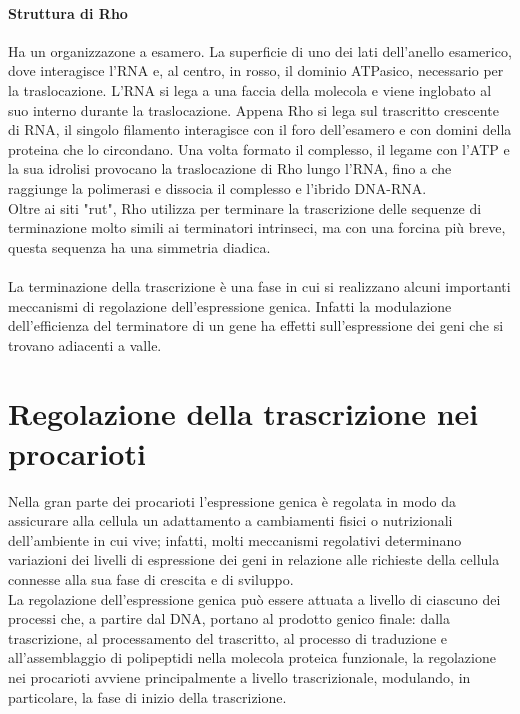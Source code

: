 \documentclass{article}
\begin{document}
\paragraph{Struttura di Rho}
Ha un organizzazone a esamero. La  superficie di uno dei lati dell'anello esamerico, dove interagisce l'RNA e, al centro, in rosso, il dominio ATPasico, necessario per la traslocazione.
L'RNA si lega a una faccia della molecola e viene inglobato al suo interno
durante la traslocazione. Appena Rho si lega sul trascritto
crescente di RNA, il singolo filamento interagisce con il foro dell'esamero e
con domini della proteina che lo circondano. Una volta formato il complesso,
il legame con l'ATP e la sua idrolisi provocano la traslocazione di Rho lungo
l'RNA, fino a che raggiunge la polimerasi e dissocia il complesso e l'ibrido
DNA-RNA.\\
Oltre ai siti "rut", Rho utilizza per terminare la trascrizione delle sequenze
di terminazione molto simili ai terminatori intrinseci, ma con una forcina più
breve, questa sequenza ha una simmetria diadica.
\paragraph{}La terminazione della trascrizione è una fase in cui si realizzano alcuni importanti meccanismi di regolazione dell'espressione genica. Infatti la modulazione
dell'efficienza del terminatore di un gene ha effetti sull'espressione dei geni che si trovano adiacenti a valle. 
\section{Regolazione della trascrizione nei procarioti}
Nella gran parte dei procarioti l'espressione genica è regolata in modo da assicurare alla cellula un adattamento a cambiamenti fisici o nutrizionali dell'ambiente
in cui vive; infatti, molti meccanismi regolativi determinano variazioni dei livelli
di espressione dei geni in relazione alle richieste della cellula connesse alla sua
fase di crescita e di sviluppo. \\
La regolazione dell'espressione genica può essere attuata a livello di ciascuno
dei processi che, a partire dal DNA, portano al prodotto genico finale: dalla trascrizione, al processamento del trascritto, al processo di traduzione e 
all'assemblaggio di polipeptidi nella molecola proteica funzionale, 
la regolazione nei procarioti avviene principalmente a livello trascrizionale, modulando, 
in particolare, la fase di inizio della trascrizione.
\end{document}
